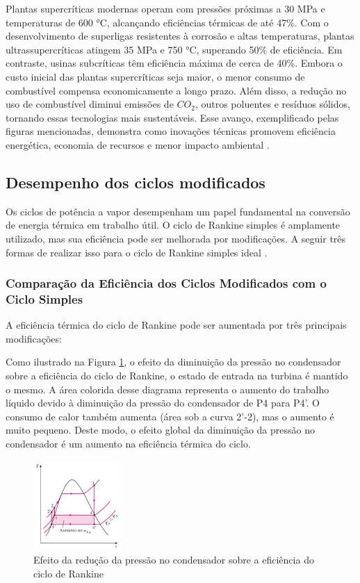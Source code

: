 \documentclass[
	article,			%
	11pt,				%
	oneside,			%
	a4paper,			%
	english,			%
	brazil,				%
	sumario=tradicional
	]{abntex2}
\begin{document}
Plantas supercríticas modernas operam com pressões próximas a 30 MPa e temperaturas de 600 °C, alcançando eficiências térmicas de até 47\%. Com o desenvolvimento de superligas resistentes à corrosão e altas temperaturas, plantas ultrassupercríticas atingem 35 MPa e 750 °C, superando 50\% de eficiência. Em contraste, usinas subcríticas têm eficiência máxima de cerca de 40\%. Embora o custo inicial das plantas supercríticas seja maior, o menor consumo de combustível compensa economicamente a longo prazo. Além disso, a redução no uso de combustível diminui emissões de $CO_2$, outros poluentes e resíduos sólidos, tornando essas tecnologias mais sustentáveis. Esse avanço, exemplificado pelas figuras mencionadas, demonstra como inovações técnicas promovem eficiência energética, economia de recursos e menor impacto ambiental \cite{moran-2018}.

\subsection{Desempenho dos ciclos modificados}

Os ciclos de potência a vapor desempenham um papel fundamental na conversão de energia térmica em trabalho útil. O ciclo de Rankine simples é amplamente utilizado, mas sua eficiência pode ser melhorada por modificações. A seguir três formas de realizar isso para o ciclo de Rankine simples ideal \cite{cengel-2008}.

\subsubsection{Comparação da Eficiência dos Ciclos Modificados com o Ciclo Simples}

A eficiência térmica do ciclo de Rankine pode ser aumentada por três principais modificações:


Como ilustrado na Figura \ref{fig:reducao-pressao}, o efeito da diminuição da pressão no condensador sobre a eficiência do ciclo de Rankine, o estado de entrada na turbina é mantido o mesmo. A área colorida desse diagrama representa o aumento do trabalho líquido devido à diminuição da pressão do condensador de P4 para P4'. O consumo de calor também aumenta (área sob a curva 2'-2), mas o aumento é muito pequeno. Deste modo, o efeito global da diminuição da pressão no condensador é um aumento na eficiência térmica do ciclo.

\begin{figure}[h]
	\centering
	\includegraphics[width=0.3\textwidth]{./images/reducao-pressao.png}
	\caption{Efeito da redução da pressão no condensador sobre a eficiência do ciclo de Rankine}
	\label{fig:reducao-pressao}
\end{figure}
\end{document}
